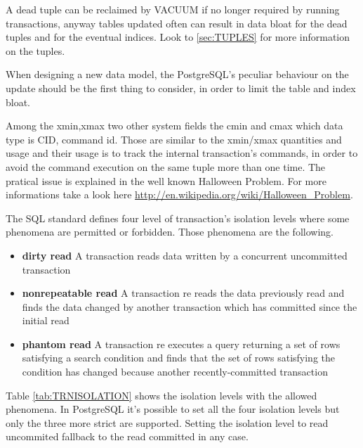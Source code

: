 A dead tuple can be reclaimed by VACUUM if no longer required by running 
transactions, anyway tables updated often can result in data bloat for the dead 
tuples and for the eventual indices.
Look to \ref{sec:TUPLES} for more information on the 
tuples.\newline

When designing a new data model, the PostgreSQL's peculiar behaviour on the 
update should be the first thing to consider, in order to limit the table 
and index bloat. \newline

Among the xmin,xmax two other system fields the cmin and cmax which data type 
is CID, command id. Those are similar to the xmin/xmax quantities and usage 
and their usage is to track the internal transaction's commands, in order to 
avoid the command execution on the same tuple more than one time. The pratical 
issue is explained in the well known Halloween Problem. For more informations 
take a look here 
\href{http://en.wikipedia.org/wiki/Halloween_Problem}{
http://en.wikipedia.org/wiki/Halloween\_Problem}.\newline

The SQL standard defines four level of transaction's isolation levels where 
some phenomena are permitted or forbidden.
Those phenomena are the following.

\begin{itemize}
 \item \textbf{dirty read} A transaction reads data written by a concurrent 
uncommitted transaction

\item \textbf{nonrepeatable read} A transaction re reads the data previously 
read and finds the data changed by another transaction which has
committed since the initial read

\item \textbf{phantom read} A transaction re executes a query returning a set 
of rows satisfying a search condition and finds that the set of rows 
satisfying the condition has changed because another recently-committed 
transaction

\end{itemize}

Table \ref{tab:TRNISOLATION} shows the isolation levels with the 
allowed phenomena. In PostgreSQL it's possible to set all the four 
isolation levels but only the three more strict are supported. Setting the 
isolation level to read uncommited fallback to the read committed in any case.

